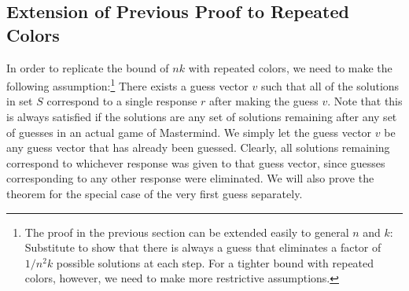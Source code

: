 \documentclass[12pt, a4paper]{article}
\begin{document}
\clearpage
\subsection{Extension of Previous Proof to Repeated Colors}
	In order to replicate the bound of $nk$ with repeated colors, we need to make the
	following assumption:\footnote{The proof in the previous section can be extended
	easily to general $n$ and $k$: Substitute to show that there is always a guess that
	eliminates a factor of $1/n^2k$ possible solutions at each step. For a tighter
	bound with repeated colors, however, we need to make more restrictive assumptions.}
	There exists a guess vector $v$ such that all of the solutions in set $S$
	correspond to a single response $r$ after making the guess $v$. Note that this
	is always satisfied if the solutions are any set of solutions remaining after
	any set of guesses in an actual game of Mastermind. We simply let the guess vector
	$v$ be any guess vector that has already been guessed. Clearly, all solutions
	remaining correspond to whichever response was given to that guess vector, since
	guesses corresponding to any other response were eliminated. We will also prove the
	theorem for the special case of the very first guess separately.
	
\end{document}
